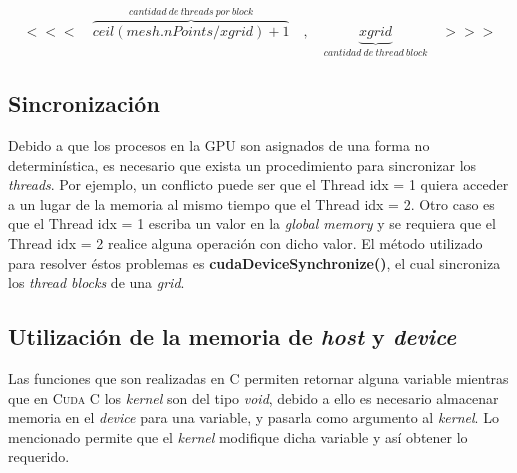 \begin{align*}
		<<<\quad \overbrace{ceil(mesh.nPoints/xgrid)+1}^{cantidad \>de\> \textit{threads}\> por\> \textit{block}}\quad,\quad \underbrace{xgrid}_{cantidad\>de\>thread\>block} \quad>>>
\end{align*}

\subsection{Sincronización}

Debido a que los procesos en la GPU son asignados de una forma no determinística, es necesario que exista un procedimiento para sincronizar los \textit{threads}. Por ejemplo, un conflicto puede ser que el Thread idx = 1 quiera acceder a un lugar de la memoria al mismo tiempo que el Thread idx = 2. Otro caso es que el Thread idx = 1 escriba un valor en la \textit{global memory} y se requiera que el Thread idx = 2 realice alguna operación con dicho valor. El método utilizado para resolver éstos problemas es \textbf{cudaDeviceSynchronize()}, el cual sincroniza los \textit{thread blocks} de una \textit{grid}.

\subsection{Utilización de la memoria de \textit{host} y \textit{device}}


Las funciones que son realizadas en \textsc{C} permiten retornar alguna variable mientras que en \textsc{Cuda C} los \textit{kernel} son del tipo \textit{void}, debido a ello es necesario almacenar memoria en el \textit{device} para una variable, y pasarla como argumento al \textit{kernel}. Lo mencionado permite que el \textit{kernel} modifique dicha variable y así obtener lo requerido. 

